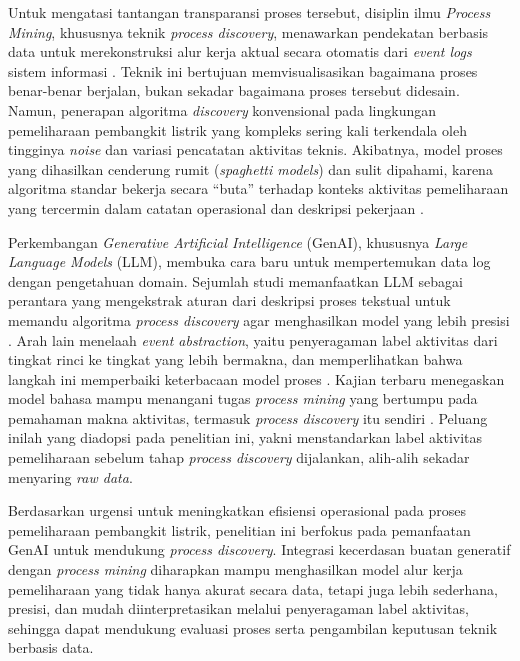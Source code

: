 Untuk mengatasi tantangan transparansi proses tersebut, disiplin ilmu \textit{Process Mining}, khususnya teknik \textit{process discovery}, menawarkan pendekatan berbasis data untuk merekonstruksi alur kerja aktual secara otomatis dari \textit{event logs} sistem informasi \cite{vanderAalst2016_process_mining}. Teknik ini bertujuan memvisualisasikan bagaimana proses benar-benar berjalan, bukan sekadar bagaimana proses tersebut didesain. Namun, penerapan algoritma \textit{discovery} konvensional pada lingkungan pemeliharaan pembangkit listrik yang kompleks sering kali terkendala oleh tingginya \textit{noise} dan variasi pencatatan aktivitas teknis. Akibatnya, model proses yang dihasilkan cenderung rumit (\textit{spaghetti models}) dan sulit dipahami, karena algoritma standar bekerja secara ``buta'' terhadap konteks aktivitas pemeliharaan yang tercermin dalam catatan operasional dan deskripsi pekerjaan \cite{augusto2019automated}.

Perkembangan \textit{Generative Artificial Intelligence} (GenAI), khususnya \textit{Large Language Models} (LLM), membuka cara baru untuk mempertemukan data log dengan pengetahuan domain. Sejumlah studi memanfaatkan LLM sebagai perantara yang mengekstrak aturan dari deskripsi proses tekstual untuk memandu algoritma \textit{process discovery} agar menghasilkan model yang lebih presisi \cite{norouzifar2024}. Arah lain menelaah \textit{event abstraction}, yaitu penyeragaman label aktivitas dari tingkat rinci ke tingkat yang lebih bermakna, dan memperlihatkan bahwa langkah ini memperbaiki keterbacaan model proses \cite{tax2016event}. Kajian terbaru menegaskan model bahasa mampu menangani tugas \textit{process mining} yang bertumpu pada pemahaman makna aktivitas, termasuk \textit{process discovery} itu sendiri \cite{rebmann2025semantics}. Peluang inilah yang diadopsi pada penelitian ini, yakni menstandarkan label aktivitas pemeliharaan sebelum tahap \textit{process discovery} dijalankan, alih-alih sekadar menyaring \textit{raw data}.

Berdasarkan urgensi untuk meningkatkan efisiensi operasional pada proses pemeliharaan pembangkit listrik, penelitian ini berfokus pada pemanfaatan GenAI untuk mendukung \textit{process discovery}. Integrasi kecerdasan buatan generatif dengan \textit{process mining} diharapkan mampu menghasilkan model alur kerja pemeliharaan yang tidak hanya akurat secara data, tetapi juga lebih sederhana, presisi, dan mudah diinterpretasikan melalui penyeragaman label aktivitas, sehingga dapat mendukung evaluasi proses serta pengambilan keputusan teknik berbasis data.

